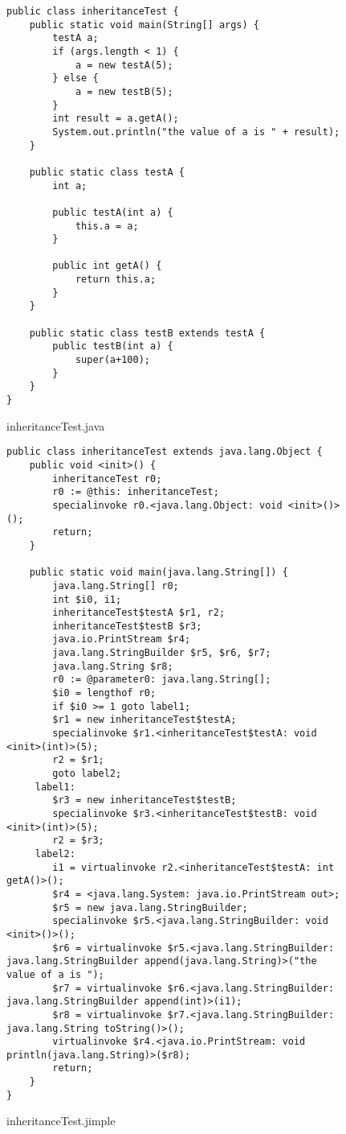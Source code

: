 \documentclass{dithesis}
\begin{document}
            \begin{figure}[H]
\begin{lstlisting}
public class inheritanceTest {
    public static void main(String[] args) {
        testA a;
        if (args.length < 1) {
            a = new testA(5);
        } else {
            a = new testB(5);
        }
        int result = a.getA();
        System.out.println("the value of a is " + result);
    }

    public static class testA {
        int a;

        public testA(int a) {
            this.a = a;
        }

        public int getA() {
            return this.a;
        }
    }

    public static class testB extends testA {
        public testB(int a) {
            super(a+100);
        }
    }
}
\end{lstlisting}
            \caption{inheritanceTest.java}
            \end{figure}
            \begin{figure}[H]
\begin{lstlisting}
public class inheritanceTest extends java.lang.Object {
    public void <init>() {
        inheritanceTest r0;
        r0 := @this: inheritanceTest;
        specialinvoke r0.<java.lang.Object: void <init>()>();
        return;
    }

    public static void main(java.lang.String[]) {
        java.lang.String[] r0;
        int $i0, i1;
        inheritanceTest$testA $r1, r2;
        inheritanceTest$testB $r3;
        java.io.PrintStream $r4;
        java.lang.StringBuilder $r5, $r6, $r7;
        java.lang.String $r8;
        r0 := @parameter0: java.lang.String[];
        $i0 = lengthof r0;
        if $i0 >= 1 goto label1;
        $r1 = new inheritanceTest$testA;
        specialinvoke $r1.<inheritanceTest$testA: void <init>(int)>(5);
        r2 = $r1;
        goto label2;
     label1:
        $r3 = new inheritanceTest$testB;
        specialinvoke $r3.<inheritanceTest$testB: void <init>(int)>(5);
        r2 = $r3;
     label2:
        i1 = virtualinvoke r2.<inheritanceTest$testA: int getA()>();
        $r4 = <java.lang.System: java.io.PrintStream out>;
        $r5 = new java.lang.StringBuilder;
        specialinvoke $r5.<java.lang.StringBuilder: void <init>()>();
        $r6 = virtualinvoke $r5.<java.lang.StringBuilder: java.lang.StringBuilder append(java.lang.String)>("the value of a is ");
        $r7 = virtualinvoke $r6.<java.lang.StringBuilder: java.lang.StringBuilder append(int)>(i1);
        $r8 = virtualinvoke $r7.<java.lang.StringBuilder: java.lang.String toString()>();
        virtualinvoke $r4.<java.io.PrintStream: void println(java.lang.String)>($r8);
        return;
    }
}
\end{lstlisting}
            \caption{inheritanceTest.jimple}
            \end{figure}
\end{document}
